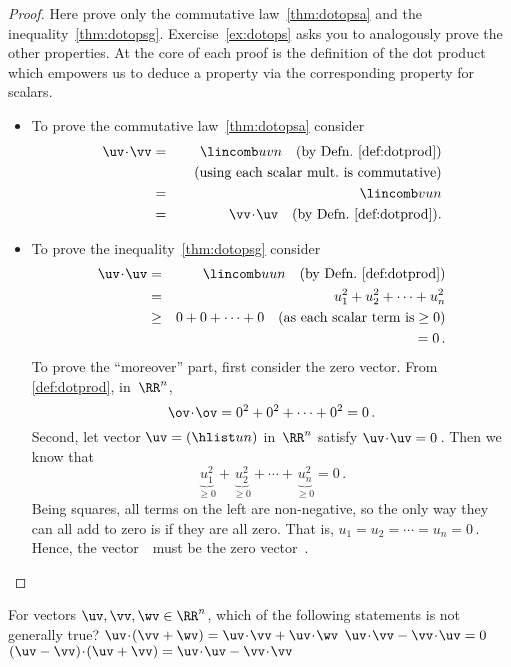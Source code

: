 \begin{proof} 
Here prove only the commutative law~\ref{thm:dotopsa} and the inequality~\ref{thm:dotopsg}.
Exercise~\ref{ex:dotops} asks you to analogously prove the other properties.
At the core of each proof is the definition of the dot product which empowers us to deduce a property via the corresponding property for scalars.
\begin{itemize}
\item To prove the commutative law~\ref{thm:dotopsa} consider
\begin{eqnarray*}
\uv\cdot\vv&=&\lincomb uvn \quad(\text{by Defn.~\ref{def:dotprod}})
\\&&\quad(\text{using each scalar mult.\ is commutative})
\\&=&\lincomb vun
\\&=&\vv\cdot\uv \quad(\text{by Defn.~\ref{def:dotprod}}).
\end{eqnarray*}

\item To prove the inequality~\ref{thm:dotopsg} consider
\begin{eqnarray*}
\uv\cdot\uv&=&\lincomb uun\quad(\text{by Defn.~\ref{def:dotprod}})
\\&=&u_1^2+u_2^2+\cdots+u_n^2
\\&\geq&0+0+\cdots+0 \quad(\text{as each scalar term is}\geq0)
\\&&{}=0\,.
\end{eqnarray*}
To prove the ``moreover'' part, first consider the zero vector.
From \autoref{def:dotprod}, in~\(\RR^n\),
\begin{equation*}
\ov\cdot\ov={0^2+0^2+\cdots+0^2}=0\,.
\end{equation*}
Second, let vector \(\uv=(\hlist un)\) in~\(\RR^n\) satisfy \(\uv\cdot\uv=0\)\,.
Then we know that
\begin{equation*}
\underbrace{u_1^2}_{\geq0}+\underbrace{u_2^2}_{\geq0}
+\cdots+\underbrace{u_n^2}_{\geq0}=0\,.
\end{equation*}
Being squares, all terms on the left are non-negative, so the only way they can all add to zero is if they are all zero.
That is, \(u_1=u_2=\cdots=u_n=0\)\,.
Hence, the vector~\uv\ must be the zero vector~\ov.
\end{itemize}
\end{proof}



\begin{activity}
For vectors \(\uv,\vv,\wv\in\RR^n\), which of the following statements is not generally true?
{\(\uv\cdot(\vv+\wv)=\uv\cdot\vv+\uv\cdot\wv\)}
{\(\uv\cdot\vv-\vv\cdot\uv=0\)}
{\((\uv-\vv)\cdot(\uv+\vv)=\uv\cdot\uv-\vv\cdot\vv\)}
\end{activity}



